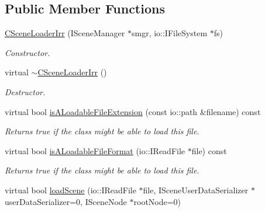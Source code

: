 \subsection*{Public Member Functions}
\begin{DoxyCompactItemize}
\item 
\hypertarget{classirr_1_1scene_1_1_c_scene_loader_irr_a219e08b05ce899bc2bbe0bb28806a727}{\hyperlink{classirr_1_1scene_1_1_c_scene_loader_irr_a219e08b05ce899bc2bbe0bb28806a727}{C\-Scene\-Loader\-Irr} (I\-Scene\-Manager $\ast$smgr, io\-::\-I\-File\-System $\ast$fs)}\label{classirr_1_1scene_1_1_c_scene_loader_irr_a219e08b05ce899bc2bbe0bb28806a727}

\begin{DoxyCompactList}\small\item\em Constructor. \end{DoxyCompactList}\item 
\hypertarget{classirr_1_1scene_1_1_c_scene_loader_irr_a7cef29d6064f8aecc4a6401321111d7c}{virtual \hyperlink{classirr_1_1scene_1_1_c_scene_loader_irr_a7cef29d6064f8aecc4a6401321111d7c}{$\sim$\-C\-Scene\-Loader\-Irr} ()}\label{classirr_1_1scene_1_1_c_scene_loader_irr_a7cef29d6064f8aecc4a6401321111d7c}

\begin{DoxyCompactList}\small\item\em Destructor. \end{DoxyCompactList}\item 
\hypertarget{classirr_1_1scene_1_1_c_scene_loader_irr_a7517a16711700f4a3c090548ca42157f}{virtual bool \hyperlink{classirr_1_1scene_1_1_c_scene_loader_irr_a7517a16711700f4a3c090548ca42157f}{is\-A\-Loadable\-File\-Extension} (const io\-::path \&filename) const }\label{classirr_1_1scene_1_1_c_scene_loader_irr_a7517a16711700f4a3c090548ca42157f}

\begin{DoxyCompactList}\small\item\em Returns true if the class might be able to load this file. \end{DoxyCompactList}\item 
\hypertarget{classirr_1_1scene_1_1_c_scene_loader_irr_a60035f409070f0fadc88fedb71bbe92d}{virtual bool \hyperlink{classirr_1_1scene_1_1_c_scene_loader_irr_a60035f409070f0fadc88fedb71bbe92d}{is\-A\-Loadable\-File\-Format} (io\-::\-I\-Read\-File $\ast$file) const }\label{classirr_1_1scene_1_1_c_scene_loader_irr_a60035f409070f0fadc88fedb71bbe92d}

\begin{DoxyCompactList}\small\item\em Returns true if the class might be able to load this file. \end{DoxyCompactList}\item 
\hypertarget{classirr_1_1scene_1_1_c_scene_loader_irr_a6fb84da8f8f3f61b174e6b18866aec65}{virtual bool \hyperlink{classirr_1_1scene_1_1_c_scene_loader_irr_a6fb84da8f8f3f61b174e6b18866aec65}{load\-Scene} (io\-::\-I\-Read\-File $\ast$file, I\-Scene\-User\-Data\-Serializer $\ast$user\-Data\-Serializer=0, I\-Scene\-Node $\ast$root\-Node=0)}\label{classirr_1_1scene_1_1_c_scene_loader_irr_a6fb84da8f8f3f61b174e6b18866aec65}


\end{DoxyCompactItemize}
